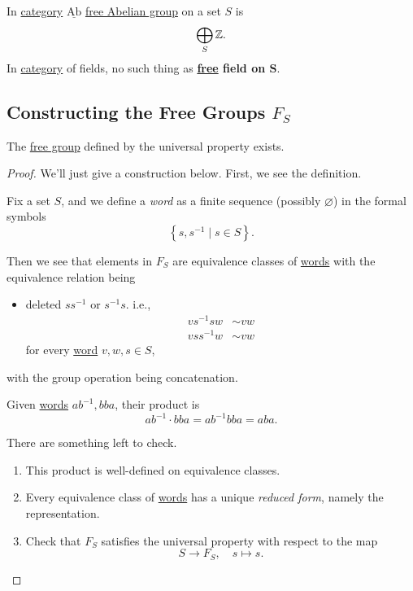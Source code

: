 \begin{eg}
	In \hyperref[def:category]{category} \(\underline{\mathrm{Ab}}\) \hyperref[def:free-Abelian-group]{free Abelian group} on a set \(S\) is
	\[
		\bigoplus_S \mathbb{\MakeUppercase{z}}.
	\]
	In \hyperref[def:category]{category} of fields, no such thing as \textbf{\hyperref[def:free-group]{free} field on \(\bm{S} \)}.
\end{eg}

\subsection{Constructing the Free Groups \(F_S\)}
\begin{proposition}
	The \hyperref[def:free-group]{free group} defined by the universal property exists.
\end{proposition}
\begin{proof}
	We'll just give a construction below. First, we see the definition.
	\begin{definition}[Word]\label{def:word}
		Fix a set \(S\), and we define a \emph{word} as a finite sequence (possibly \(\varnothing \))
		in the formal symbols
		\[
			\left\{s, s ^{-1} \mid s\in S\right\}.
		\]
	\end{definition}

	Then we see that elements in \(F_S\) are equivalence classes of \hyperref[def:word]{words} with the equivalence relation being
	\begin{itemize}
		\item deleted \(s s ^{-1} \) or \(s ^{-1} s\). i.e.,
		      \[
			      \begin{split}
				      vs ^{-1} s w&\sim vw\\
				      v s s ^{-1}  w &\sim vw
			      \end{split}
		      \]
		      for every \hyperref[def:word]{word} \(v, w, s\in S\),
	\end{itemize}
	with the group operation being concatenation.
	\begin{eg}
		Given \hyperref[def:word]{words} \(ab^{-1} , bba\), their product is
		\[
			ab^{-1} \cdot bba = ab^{-1}  bb a = aba.
		\]
	\end{eg}
	\begin{exercise}
		There are something left to check.
		\begin{enumerate}[(1)]
			\item This product is well-defined on equivalence classes.
			\item Every equivalence class of \hyperref[def:word]{words} has a unique \emph{reduced form}, namely the representation.
			\item Check that \(F_S\) satisfies the universal property with respect to the map
			      \[
				      S\to F_S,\quad s\mapsto s.
			      \]
		\end{enumerate}
	\end{exercise}
\end{proof}

